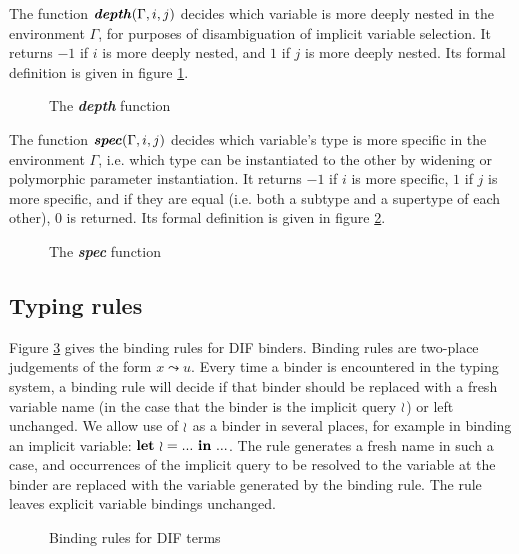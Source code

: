 The function $\textbf{\textit{depth}}(\Gamma, i, j)$ decides which variable is more deeply nested
in the environment $\Gamma$, for purposes of disambiguation of implicit variable
selection. It returns $-1$ if $i$ is more deeply nested, and $1$ if $j$ is more
deeply nested. Its formal definition is given in figure \ref{figure_depth}.

\begin{figure}[h]
    
    \caption{The \textbf{\textit{depth}} function}
    \label{figure_depth}
\end{figure}

The function $\textbf{\textit{spec}}(\Gamma, i, j)$ decides which variable's type is more
specific in the environment $\Gamma$, i.e. which type can be instantiated to the
other by widening or polymorphic parameter instantiation. It returns $-1$ if $i$
is more specific, $1$ if $j$ is more specific, and if they are equal (i.e. both
a subtype and a supertype of each other), 0 is returned. Its formal definition
is given in figure \ref{figure_spec}.

\begin{figure}[h]
    
    \caption{The \textbf{\textit{spec}} function}
    \label{figure_spec}
\end{figure}

\subsection{Typing rules}

Figure \ref{figure_binding_rules} gives the binding rules for DIF binders.
Binding rules are two-place judgements of the form $x \leadsto u$. Every time a
binder is encountered in the typing system, a binding rule will decide if that
binder should be replaced with a fresh variable name (in the case that the
binder is the implicit query $\wr$) or left unchanged. We allow use of $\wr$
as a binder in several places, for example in binding an implicit variable:
$\textbf{let}\ \wr = ...\ \textbf{in}\ ...$. The rule  generates a fresh name in such a
case, and occurrences of the implicit query to be resolved to the variable at
the binder are replaced with the variable generated by the binding rule. The
rule  leaves explicit variable bindings unchanged.

\begin{figure}[h]
    
    \caption{Binding rules for DIF terms}
    \label{figure_binding_rules}
\end{figure}

